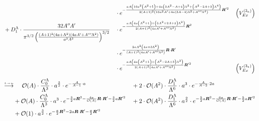 \documentclass
[aps,nofootinbib,prl,showpacs,twocolumn,groupedaddress,superscriptaddress]
{revtex4}
\newcommand*{\mprime}{^{\prime}\mkern-1.2mu}
\newcommand*{\mdprime}{^{\prime\prime}\mkern-1.2mu}
\newcommand*{\mtprime}{^{\prime\prime\prime}\mkern-1.2mu}
\newcommand{\toinf}{\ensuremath{\stackrel{\text{\scalebox{0.6}{$\Lambda\to\infty$}}}{\longrightarrow}}}
\newcommand{\ve}[1]{\ensuremath{\boldsymbol{#1}}}
\begin{document}
\begin{widetext}
\begin{align*}
&&&\cdot e^{-\frac{a A \left(16 a^2 \left(A^2+1\right)+4 a \left(3 A^2-A+4\right) \Lambda ^2+\left(A^2-2 A+3\right) \Lambda ^4\right)}{2 (A+1)^2 \left(16 a^2 A\mprime+4 a (3 A-4) \Lambda ^2+A\mtprime \Lambda ^4\right)}\ve{R}'^2}&&\left(V^{(3_a)}_{Ex}\right)\\
&+D_1^\Lambda\cdot\frac{32 A\mdprime A\mprime}{\pi ^{3/2} \left(\frac{(A+1)^2 \left(4 a+\Lambda ^2\right) \left(4 a A\mprime+A\mtprime \Lambda ^2\right)}{a^3 A^3}\right)^{3/2}}
&&\cdot e^{-\frac{a A \left(4 a \left(A^2+1\right)+\left(5 A^2+2 A+3\right) \Lambda ^2\right)}{2 (A+1)^2 \left(4 a A\mprime+A\mtprime \Lambda ^2\right)}\ve{R}^2}\\
&&&\cdot e^{-\frac{2 a A^2 \left(4 a+3 \Lambda ^2\right)}{(A+1)^2 \left(4 a A\mprime+A\mtprime \Lambda ^2\right)}\ve{R}\cdot\ve{R}'}\\
&&&\cdot e^{-\frac{a A \left(4 a \left(A^2+1\right)+\left(A^2-2 A+3\right) \Lambda ^2\right)}{2 (A+1)^2 \left(4 a A\mprime+A\mtprime \Lambda ^2\right)}\ve{R}'^2}&&\left(V^{(3_*)}_{Ex}\right)\\
\end{align*}
\begin{align*}
\toinf&\;\;\;\;\;\mathcal{O}(A)\cdot\frac{C_0^\Lambda}{\Lambda^3}\cdot a^{\frac{3}{2}}\cdot e^{-\frac{A}{A-1}\cdot a}
&&+2\cdot\mathcal{O}(A^2)\cdot \frac{D_1^\Lambda}{\Lambda^6}\cdot a^3\cdot e^{-\frac{A}{A-2}\cdot 2a}\\
&+\mathcal{O}(A)\cdot\frac{C_0^\Lambda}{\Lambda^3}\cdot a^{3}\cdot e^{-\frac{3}{2}a\ve{R}^2-\frac{4a}{\mathcal{O}(A)}\ve{R}\cdot\ve{R}'-\frac{3}{2}a\ve{R}'^2}
&&+2\cdot\mathcal{O}(A^2)\cdot\frac{D_1^\Lambda}{\Lambda^6}\cdot a^{\frac{9}{2}}\cdot e^{-\frac{5}{2}a\ve{R}^2-\frac{6a}{\mathcal{O}(A)}\ve{R}\cdot\ve{R}'-\frac{5}{2}a\ve{R}'^2}\\
&+\mathcal{O}(1)\cdot a^{\frac{3}{2}}\cdot e^{-\frac{a}{2}\ve{R}^2-2a\ve{R}\cdot\ve{R}'-\frac{a}{2}\ve{R}'^2}&&\\
\end{align*}
\end{widetext}
\newpage



\end{document}
